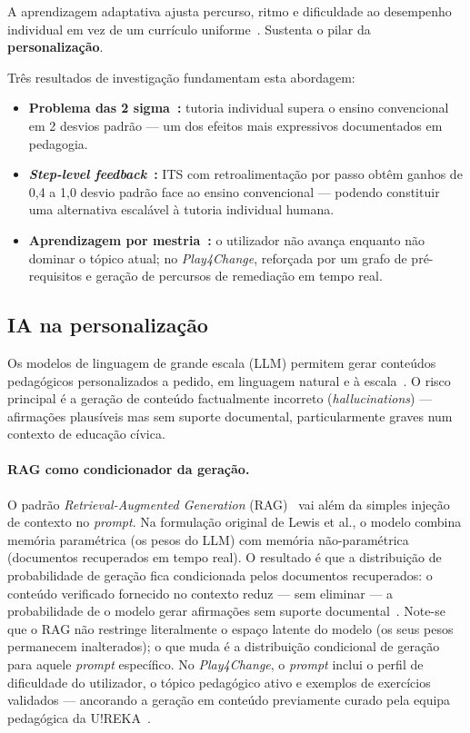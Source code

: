 A aprendizagem adaptativa ajusta percurso, ritmo e dificuldade ao desempenho individual em vez de um currículo uniforme~\cite{vanlehn2011relative}. Sustenta o pilar da \textbf{personalização}.

Três resultados de investigação fundamentam esta abordagem:

\begin{itemize}
    \item \textbf{Problema das 2 sigma~\cite{bloom1984sigma}:} tutoria individual supera o ensino convencional em 2 desvios padrão --- um dos efeitos mais expressivos documentados em pedagogia.
    \item \textbf{\emph{Step-level feedback}~\cite{vanlehn2011relative}:} ITS com retroalimentação por passo obtêm ganhos de 0,4 a 1,0 desvio padrão face ao ensino convencional --- podendo constituir uma alternativa escalável à tutoria individual humana.
    \item \textbf{Aprendizagem por mestria~\cite{bloom1968learning}:} o utilizador não avança enquanto não dominar o tópico atual; no \emph{Play4Change}, reforçada por um grafo de pré-requisitos e geração de percursos de remediação em tempo real.
\end{itemize}

\subsection*{IA na personalização}

Os modelos de linguagem de grande escala (LLM) permitem gerar conteúdos pedagógicos personalizados a pedido, em linguagem natural e à escala~\cite{kasneci2023chatgpt}. O risco principal é a geração de conteúdo factualmente incorreto (\emph{hallucinations}) --- afirmações plausíveis mas sem suporte documental, particularmente graves num contexto de educação cívica.

\paragraph*{RAG como condicionador da geração.}
O padrão \emph{Retrieval-Augmented Generation} (RAG)~\cite{lewis2020rag} vai além da simples injeção de contexto no \emph{prompt}. Na formulação original de Lewis et al., o modelo combina memória paramétrica (os pesos do LLM) com memória não-paramétrica (documentos recuperados em tempo real). O resultado é que a distribuição de probabilidade de geração fica condicionada pelos documentos recuperados: o conteúdo verificado fornecido no contexto reduz --- sem eliminar --- a probabilidade de o modelo gerar afirmações sem suporte documental~\cite{gao2023rag}. Note-se que o RAG não restringe literalmente o espaço latente do modelo (os seus pesos permanecem inalterados); o que muda é a distribuição condicional de geração para aquele \emph{prompt} específico. No \emph{Play4Change}, o \emph{prompt} inclui o perfil de dificuldade do utilizador, o tópico pedagógico ativo e exemplos de exercícios validados --- ancorando a geração em conteúdo previamente curado pela equipa pedagógica da U!REKA~\citep{ureka2026alliance}.

